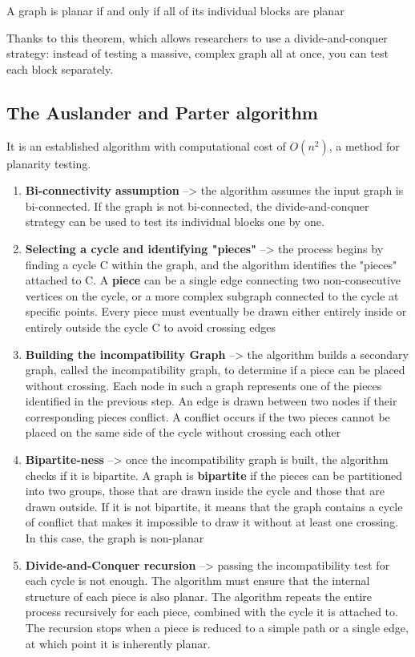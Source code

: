 \begin{theorem}[Planarity]
    A graph is planar if and only if all of its individual blocks are planar
\end{theorem}
Thanks to this theorem, which allows researchers to use a divide-and-conquer strategy: instead of testing a massive, complex graph all at once, you can test each block separately.

\subsection{The Auslander and Parter algorithm}
It is an established algorithm with computational cost of \(O(n^2)\), a method for planarity testing. 
\begin{enumerate}[noitemsep]
    \item \textbf{Bi-connectivity assumption} --> the algorithm assumes the input graph is bi-connected. If the graph is not bi-connected, the divide-and-conquer strategy can be used to test its individual blocks one by one.
    \item \textbf{Selecting a cycle and identifying "pieces"} --> the process begins by finding a cycle C within the graph, and the algorithm identifies the "pieces" attached to C. A \textbf{piece} can be a single edge connecting two non-consecutive vertices on the cycle, or a more complex subgraph connected to the cycle at specific points. Every piece must eventually be drawn either entirely inside or entirely outside the cycle C to avoid crossing edges
    \item \textbf{Building the incompatibility Graph} --> the algorithm builds a secondary graph, called the incompatibility graph, to determine if a piece can be placed without crossing. Each node in such a graph represents one of the pieces identified in the previous step. An edge is drawn between two nodes if their corresponding pieces conflict. A conflict occurs if the two pieces cannot be placed on the same side of the cycle without crossing each other
    \item \textbf{Bipartite-ness} --> once the incompatibility graph is built, the algorithm checks if it is bipartite. A graph is \textbf{bipartite} if the pieces can be partitioned into two groups, those that are drawn inside the cycle and those that are drawn outside. If it is not bipartite, it means that the graph contains a cycle of conflict that makes it impossible to draw it without at least one crossing. In this case, the graph is non-planar
    \item \textbf{Divide-and-Conquer recursion} --> passing the incompatibility test for each cycle is not enough. The algorithm must ensure that the internal structure of each piece is also planar. The algorithm repeats the entire process recursively for each piece, combined with the cycle it is attached to. The recursion stops when a piece is reduced to a simple path or a single edge, at which point it is inherently planar.
\end{enumerate}

